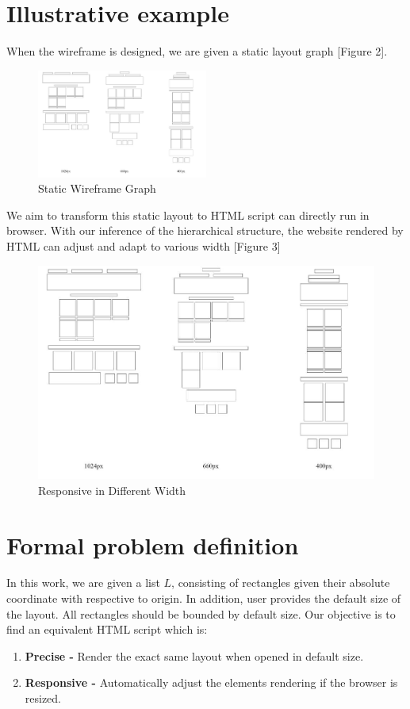\documentclass[runningheads]{llncs}
\begin{document}
\section{Illustrative example}
When the wireframe is designed, we are given a static layout graph [Figure 2].
\begin{figure}[H]
  \vspace*{-0.1in}
  \includegraphics[width=0.5\textwidth]{src/compare.JPG}
  \caption{Static Wireframe Graph}
\end{figure}
We aim to transform this static layout to HTML script can directly run in browser. With our inference of the hierarchical structure, the website rendered by HTML can adjust and adapt to various width [Figure 3]
\begin{figure}[H]
  \vspace*{-0.1in}
  \includegraphics[width=1\textwidth]{src/compare.JPG}
  \caption{Responsive in Different Width}
\end{figure}

\section{Formal problem definition}
In this work, we are given a list $L$, consisting of rectangles given their absolute coordinate with respective to origin. In addition, user provides the default size of the layout. All rectangles should be bounded by default size. Our objective is to find an equivalent HTML script which is: 
\begin{enumerate}
  \item \textbf{Precise -} Render the exact same layout when opened in  default size.
  \item \textbf{Responsive -} Automatically adjust the elements rendering if the browser is resized.
\end{enumerate}
\end{document}
